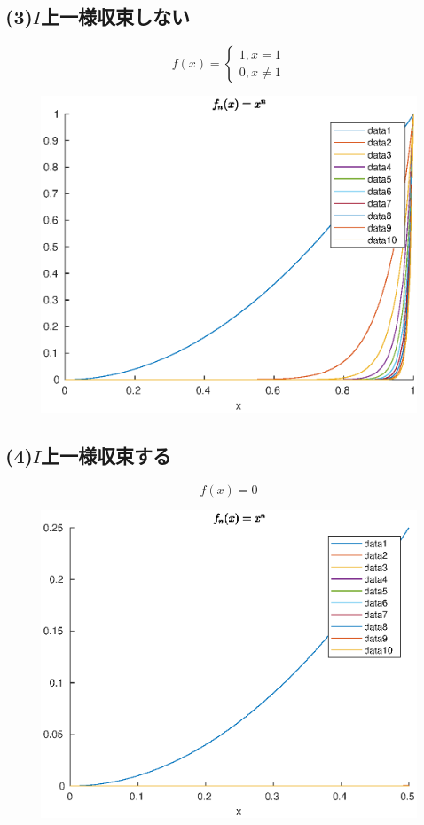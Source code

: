 \documentclass{jreport}
\begin{document}
\subsection{(3)$I$上一様収束しない}
$$
f(x)=
\begin{cases}
	1,x=1\\
	0,x\neq 1
\end{cases}
$$
\begin{figure}[H]
	\centering
	\includegraphics[scale=0.3]{3.eps}
\end{figure}
\subsection{(4)$I$上一様収束する}
$$
f(x) = 0
$$
\begin{figure}[H]
	\centering
	\includegraphics[scale=0.3]{4.eps}
\end{figure}
\end{document}
